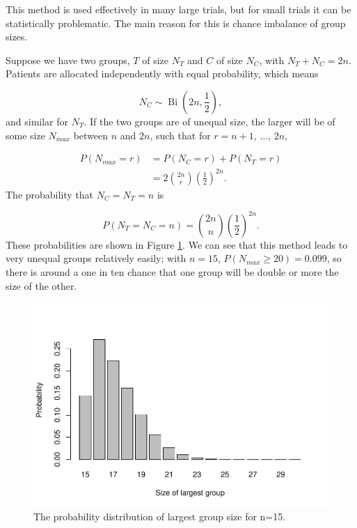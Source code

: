 \documentclass[
  openany]{book}
\theoremstyle{definition}
\theoremstyle{definition}
\theoremstyle{definition}
\theoremstyle{definition}
\theoremstyle{remark}
\begin{document}
This method is used effectively in many large trials, but for small trials it can be statistically problematic. The main reason for this is chance imbalance of group sizes.

Suppose we have two groups, \(T\) of size \(N_T\) and \(C\) of size \(N_C\), with \(N_T + N_C = 2n\). Patients are allocated independently with equal probability, which means

\[N_C \sim \operatorname{Bi}\left(2n,\frac{1}{2}\right), \]
and similar for \(N_T\). If the two groups are of unequal size, the larger will be of some size \(N_{max}\) between \(n\) and \(2n\), such that for \(r = n+1,\,\ldots,\,2n,\)

\begin{align*}
P\left(N_{max} = r\right) & = P\left(N_C = r\right) + P\left(N_T = r\right) \\
& = 2\binom{2n}{r}\left(\frac{1}{2}\right)^{2n}.
\end{align*}
The probability that \(N_C = N_T = n\) is

\[ P\left(N_T = N_C = n\right)= \binom{2n}{n}\left(\frac{1}{2}\right)^{2n}. \]
These probabilities are shown in Figure \ref{fig:srs-alloc}. We can see that this method leads to very unequal groups relatively easily; with \(n=15\), \(P\left(N_{max}\geq 20\right) = 0.099\), so there is around a one in ten chance that one group will be double or more the size of the other.

\begin{figure}
\centering
\includegraphics{CT4H_notes_files/figure-latex/srs-alloc-1.pdf}
\caption{\label{fig:srs-alloc}The probability distribution of largest group size for n=15.}
\end{figure}
\end{document}

